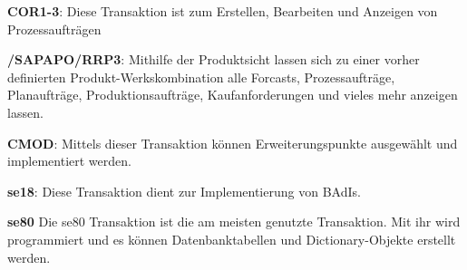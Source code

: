 \textbf{COR1-3}:
\linebreak
Diese Transaktion ist zum Erstellen, Bearbeiten und Anzeigen von Prozessaufträgen

\textbf{/SAPAPO/RRP3}:
\linebreak
Mithilfe der Produktsicht lassen sich zu einer vorher definierten Produkt-Werkskombination alle Forcasts, Prozessaufträge, Planaufträge, Produktionsaufträge, Kaufanforderungen und vieles mehr anzeigen lassen.

\textbf{CMOD}:
\linebreak
Mittels dieser Transaktion können Erweiterungspunkte ausgewählt und implementiert werden.

\textbf{se18}:
\linebreak
Diese Transaktion dient zur Implementierung von \ac{BAdI}s.

\textbf{se80}
\linebreak
Die se80 Transaktion ist die am meisten genutzte Transaktion. Mit ihr wird programmiert und es können Datenbanktabellen und Dictionary-Objekte erstellt werden.
